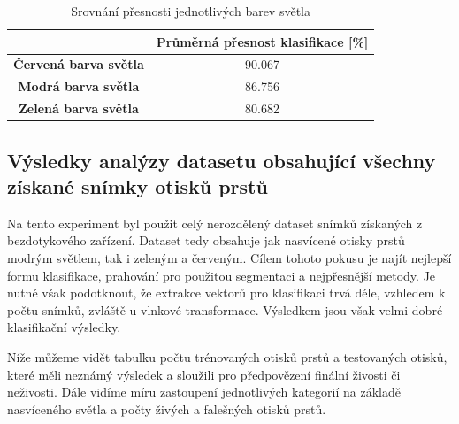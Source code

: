 \capstartfalse
\begin{table}[!htbp]
\centering
\begin{tabular}{|c|c|}
\hline
                              & \textbf{Průměrná přesnost klasifikace {[}\%{]}} \\ \hline
\textbf{Červená barva světla} & 90.067                                         \\ \hline
\textbf{Modrá barva světla}   & 86.756                                         \\ \hline
\textbf{Zelená barva světla}  & 80.682                                        \\ \hline
\end{tabular}
\caption{Srovnání přesnosti jednotlivých barev světla}
\end{table}
\capstarttrue

\subsection{Výsledky analýzy datasetu obsahující všechny získané snímky otisků prstů}
Na tento experiment byl použit celý nerozdělený dataset snímků získaných z bezdotykového zařízení. Dataset tedy obsahuje jak nasvícené otisky prstů modrým světlem, tak i zeleným a červeným. Cílem tohoto pokusu je najít nejlepší formu klasifikace, prahování pro použitou segmentaci a nejpřesnější metody. Je nutné však podotknout, že extrakce vektorů pro klasifikaci trvá déle, vzhledem k počtu snímků, zvláště u vlnkové transformace. Výsledkem jsou však velmi dobré klasifikační výsledky. 

Níže můžeme vidět tabulku počtu trénovaných otisků prstů a testovaných otisků, které měli neznámý výsledek a sloužili pro předpovězení finální živosti či neživosti. Dále vidíme míru zastoupení jednotlivých kategorií na základě nasvíceného světla a počty živých a falešných otisků prstů.

